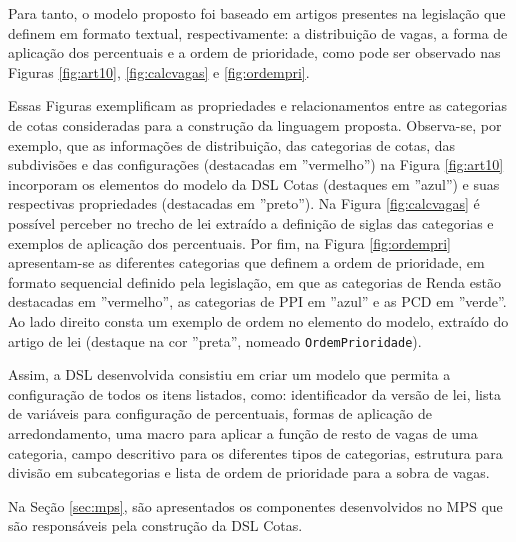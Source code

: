    Para tanto, o modelo proposto foi baseado em artigos presentes na legislação que definem em formato textual, respectivamente: a distribuição de vagas, a forma de aplicação dos percentuais e a ordem de prioridade, como pode ser observado nas Figuras \ref{fig:art10}, \ref{fig:calcvagas} e \ref{fig:ordempri}. 
   
   
   
   
   
   
   
   Essas Figuras exemplificam as propriedades e relacionamentos entre as categorias de cotas consideradas para a construção da linguagem proposta. Observa-se, por exemplo, que as informações de distribuição, das categorias de cotas, das subdivisões e das configurações (destacadas em ''vermelho'') na Figura \ref{fig:art10} incorporam os elementos do modelo da DSL Cotas (destaques em ''azul'') e suas respectivas propriedades (destacadas em ''preto''). Na Figura \ref{fig:calcvagas} é possível perceber no trecho de lei extraído a definição de siglas das categorias e exemplos de aplicação dos percentuais. Por fim, na Figura \ref{fig:ordempri} apresentam-se as diferentes categorias que definem a ordem de prioridade, em formato sequencial definido pela legislação, em que as categorias de Renda estão destacadas em ''vermelho'', as categorias de \gls{PPI} em ''azul'' e as \gls{PCD} em ''verde''. Ao lado direito consta um exemplo de ordem no elemento do modelo, extraído do artigo de lei (destaque na cor ''preta'', nomeado \texttt{OrdemPrioridade}).
  
   
  Assim, a \gls{DSL} desenvolvida consistiu em criar um modelo que permita a configuração de todos os itens listados, como: identificador da versão de lei, lista de variáveis para configuração de percentuais, formas de aplicação de arredondamento, uma macro para aplicar a função de resto de vagas de uma categoria, campo descritivo para os diferentes tipos de categorias, estrutura para divisão em subcategorias e lista de ordem de prioridade para a sobra de vagas.

   
    Na Seção \ref{sec:mps}, são apresentados os componentes desenvolvidos no MPS que são responsáveis pela construção da DSL Cotas.
    
   
